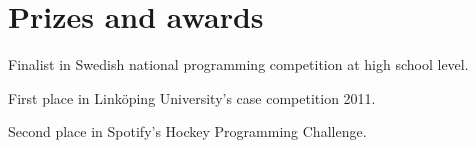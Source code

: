 \documentclass[a4paper,10pt]{article} %
\begin{document}

\section{Prizes and awards}

\begin{itemize}[noitemsep,topsep=0pt,parsep=0pt,partopsep=0pt]
\small{
\item Finalist in Swedish national programming competition at high school level.
\item First place in Linköping University’s case competition 2011.
\item Second place in Spotify’s Hockey Programming Challenge.}
\end{itemize}
\end{document}
